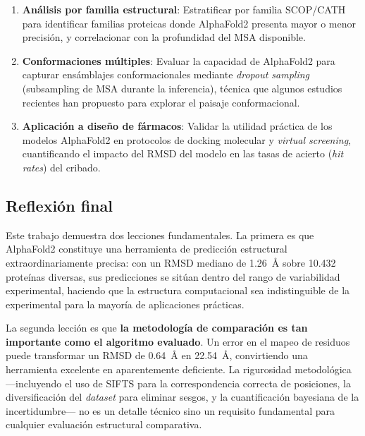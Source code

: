 \begin{enumerate}
    \item \textbf{An\'alisis por familia estructural}: Estratificar por familia
    SCOP/CATH para identificar familias proteicas donde AlphaFold2 presenta mayor
    o menor precisi\'on, y correlacionar con la profundidad del MSA disponible.

    \item \textbf{Conformaciones m\'ultiples}: Evaluar la capacidad de AlphaFold2 para
    capturar ens\'amblajes conformacionales mediante \textit{dropout sampling}
    (subsampling de MSA durante la inferencia), t\'ecnica que algunos estudios
    recientes han propuesto para explorar el paisaje conformacional.

    \item \textbf{Aplicaci\'on a dise\~no de f\'armacos}: Validar la utilidad
    pr\'actica de los modelos AlphaFold2 en protocolos de docking molecular y
    \textit{virtual screening}, cuantificando el impacto del RMSD del modelo en
    las tasas de acierto (\textit{hit rates}) del cribado.
\end{enumerate}

\subsection{Reflexi\'on final}
\label{subsec:reflexion_final}

Este trabajo demuestra dos lecciones fundamentales. La primera es que AlphaFold2
constituye una herramienta de predicci\'on estructural extraordinariamente precisa:
con un RMSD mediano de \SI{1,26}{\angstrom} sobre 10.432 prote\'inas diversas, sus
predicciones se sit\'uan dentro del rango de variabilidad experimental, haciendo que
la estructura computacional sea indistinguible de la experimental para la mayor\'ia
de aplicaciones pr\'acticas.

La segunda lecci\'on es que \textbf{la metodolog\'ia de comparaci\'on es tan
importante como el algoritmo evaluado}. Un error en el mapeo de residuos puede
transformar un RMSD de \SI{0,64}{\angstrom} en \SI{22,54}{\angstrom}, convirtiendo
una herramienta excelente en aparentemente deficiente. La rigurosidad metodol\'ogica
---incluyendo el uso de SIFTS para la correspondencia correcta de posiciones, la
diversificaci\'on del \textit{dataset} para eliminar sesgos, y la cuantificaci\'on bayesiana
de la incertidumbre--- no es un detalle t\'ecnico sino un requisito fundamental para
cualquier evaluaci\'on estructural comparativa.

